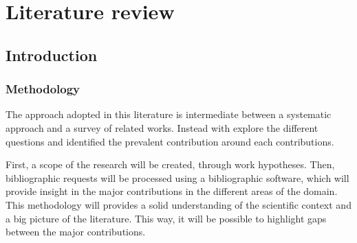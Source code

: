 \chapter{Literature review}



\section*{Introduction}
\subsection{Methodology}
The approach adopted in this literature is intermediate between a systematic approach and a survey of related works.
Instead with explore the different questions and identified the prevalent contribution around each contributions.

First, a scope of the research will be created, through work hypotheses.
Then, bibliographic requests will be processed using a bibliographic software, which will provide insight in the major contributions in the different areas of the domain.
This methodology will provides a solid understanding of the scientific context and a big picture of the literature.
This way, it will be possible to highlight gaps between the major contributions.

